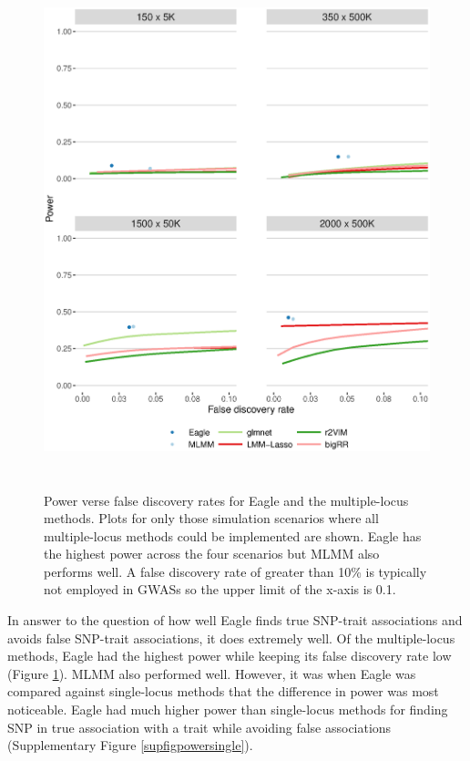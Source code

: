 \documentclass{article}
\begin{document}
\begin{figure}
\caption{Power verse false discovery rates for Eagle and the multiple-locus methods. Plots for only those simulation 
scenarios where all multiple-locus methods could be implemented are shown.  Eagle has the highest power across the four 
scenarios but MLMM also performs well. A false discovery rate of greater than 10\% is typically not employed in GWASs so the 
upper limit of the x-axis is 0.1.}
\label{figpowermultiple}
\begin{center}
\includegraphics[width=15cm, height=15cm]{power1main.eps}
\end{center}

\end{figure}







In answer to the question of how well Eagle finds true SNP-trait associations and avoids false SNP-trait associations, it does extremely 
well.  Of the multiple-locus methods, Eagle had the highest power
while keeping its false discovery rate low (Figure \ref{figpowermultiple}). MLMM also performed well. However, it was when Eagle was compared against single-locus methods 
that the difference in power was most noticeable.  Eagle had much higher power than single-locus methods for finding SNP in true 
association with a trait while avoiding false associations (Supplementary Figure \ref{supfigpowersingle}). 
\end{document}
